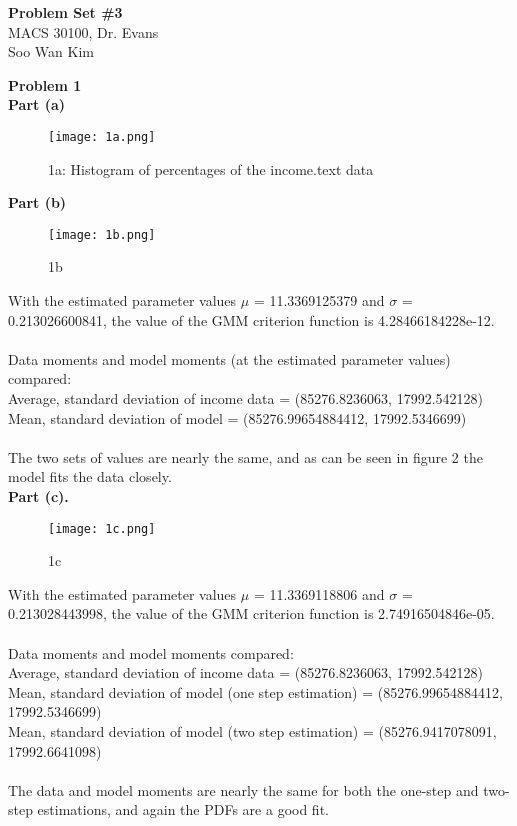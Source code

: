 \documentclass[letterpaper,12pt]{article}
\theoremstyle{definition}
\begin{document}
\begin{flushleft}
  \textbf{\large{Problem Set \#3}} \\
  MACS 30100, Dr. Evans \\
  Soo Wan Kim
\end{flushleft}

\noindent\textbf{Problem 1} \\
\textbf {Part (a)}

\begin{figure}[h!]
  \texttt{[image: 1a.png]}
  \caption{1a: Histogram of percentages of the income.text data}
\end{figure}

\noindent
\textbf {Part (b)} 

\begin{figure}[h!]
  \texttt{[image: 1b.png]}
  \caption{1b}
\end{figure}

\noindent
With the estimated parameter values $\mu$ = 11.3369125379  and $\sigma$ = 0.213026600841, the value of the GMM criterion function is 4.28466184228e-12.\\\\
Data moments and model moments (at the estimated parameter values) compared:\\
Average, standard deviation of income data = (85276.8236063, 17992.542128)\\
Mean, standard deviation of model = (85276.99654884412, 17992.5346699)\\\\
The two sets of values are nearly the same, and as can be seen in figure 2 the model fits the data closely.\\

\noindent\textbf {Part (c).} 

\begin{figure}[h!]
  \texttt{[image: 1c.png]}
  \caption{1c}
\end{figure}

\noindent
With the estimated parameter values $\mu$ = 11.3369118806 and $\sigma$ = 0.213028443998, the value of the GMM criterion function is 2.74916504846e-05.\\\\
Data moments and model moments compared:\\
Average, standard deviation of income data = (85276.8236063, 17992.542128)\\
Mean, standard deviation of model (one step estimation) = (85276.99654884412, 17992.5346699)\\
Mean, standard deviation of model (two step estimation) = (85276.9417078091, 17992.6641098)\\\\
The data and model moments are nearly the same for both the one-step and two-step estimations, and again the PDFs are a good fit.\\
\end{document}
